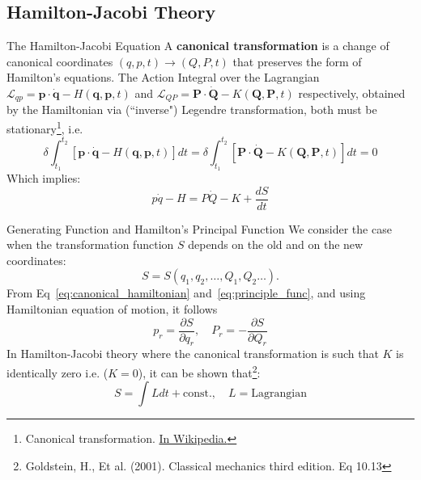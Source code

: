 \documentclass{beamer}
\begin{document}
\subsection{Hamilton-Jacobi Theory}
\begin{frame}{The Hamilton-Jacobi Equation}
     A \textbf{canonical transformation} is a change of canonical coordinates \((q, p, t) \to (Q, P, t)\) that preserves the form of Hamilton's equations. The Action Integral over the Lagrangian  \({\mathcal {L}}_{qp}=\mathbf {p} \cdot {\dot {\mathbf {q} }}-H(\mathbf {q} ,\mathbf {p} ,t)\) and  \(
     {\mathcal {L}}_{{QP}}={\mathbf {P}}\cdot {\dot {{\mathbf {Q}}}}-K({\mathbf {Q}},{\mathbf {P}},t)
     \) respectively, obtained by the Hamiltonian via (``inverse") Legendre transformation, both must be stationary\footnote{Canonical transformation.  \href{https://en.wikipedia.org/wiki/Canonical_transformation}{In Wikipedia.}}, i.e.
\begin{equation}
\label{eq:action_variation}
\delta \int _{t_{1}}^{t_{2}}\left[\mathbf {p} \cdot {\dot {\mathbf {q} }}-H(\mathbf {q} ,\mathbf {p} ,t)\right]dt = \delta \int _{t_{1}}^{t_{2}}\left[\mathbf {P} \cdot {\dot {\mathbf {Q} }}-K(\mathbf {Q} ,\mathbf {P} ,t)\right]dt =0
    \end{equation}
    Which implies:
    \begin{equation}
        \label{eq:canonical_hamiltonian}
        p \dot{q} -  H =  P \dot{Q} - K +  \dfrac{d S}{d t}
    \end{equation}
\end{frame}
\begin{frame}{Generating Function and Hamilton's Principal Function}
    We consider the case when the transformation function \(S\) depends on the old and on the new coordinates:
    \begin{equation}
        \label{eq:principle_func}
        S = S(q_1, q_2, \hdots, Q_1, Q_2 \hdots ).
    \end{equation}
     From Eq~\ref{eq:canonical_hamiltonian} and~\ref{eq:principle_func}, and using Hamiltonian equation of motion, it follows
    \begin{equation}
    \label{eq:class_trans_eq1}
    p_r = \dfrac{\partial S}{\partial q_r}, \quad P_r = -\dfrac{\partial S}{\partial Q_r}
\end{equation}
In Hamilton-Jacobi theory where the canonical transformation is such that \(K\) is identically zero i.e. (\(K = 0\)), it can be shown that\footnote{Goldstein, H., Et al. (2001). Classical mechanics third edition. Eq 10.13}: 
\begin{equation}
    \label{eq:action_eq_generator}
    \boxed{S = \int L dt + \mathrm{const.}}, \quad L \mathrm{= Lagrangian}
\end{equation}

   
\end{frame}
\end{document}
